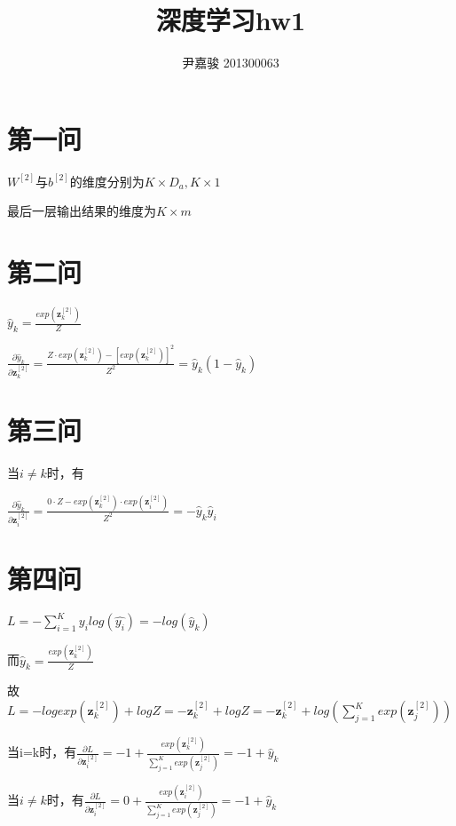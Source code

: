 \documentclass[a4paper,11pt,onecolumn,twoside]{article}
\title{\textbf{深度学习hw1}}
\author{
尹嘉骏 201300063\\[2pt]%

}
\date{}
\begin{document}
\maketitle
\section*{第一问}
$W^{[2]}$与$b^{[2]}$的维度分别为$K\times D_{a},K\times 1$

最后一层输出结果的维度为$K\times m$
\section*{第二问}
$\hat{y}_k=\frac{exp(\textbf{z}^{[2]}_k)}{Z}$

$\frac{\partial \hat{y}_k}{\partial \textbf{z}^{[2]}_k}=\frac{Z\cdot exp(\textbf{z}^{[2]}_k)-[exp(\textbf{z}^{[2]}_k)]^2}{Z^2}=\hat{y}_k(1-\hat{y}_k)$

\section*{第三问}
当$i\not=k$时，有

$\frac{\partial \hat{y}_k}{\partial \textbf{z}^{[2]}_i}=\frac{0\cdot Z-exp(\textbf{z}^{[2]}_k)\cdot exp(\textbf{z}^{[2]}_i)}{Z^2}=-\hat{y}_k\hat{y}_i$

\section*{第四问}
$L=-\sum_{i=1}^{K}y_ilog(\hat{y_i})=-log(\hat{y}_k)$

而$\hat{y}_k=\frac{exp(\textbf{z}^{[2]}_k)}{Z}$

故$L=-log exp(\textbf{z}^{[2]}_k)+logZ=-\textbf{z}^{[2]}_k+logZ=-\textbf{z}^{[2]}_k+log(\sum_{j=1}^{K}exp(\textbf{z}^{[2]}_j))$

当i=k时，有$\frac{\partial L}{\partial \textbf{z}^{[2]}_i}=-1+\frac{exp(\textbf{z}^{[2]}_k)}{\sum_{j=1}^{K}exp(\textbf{z}^{[2]}_j)}=-1+\hat{y}_k$

当$i\not=k$时，有$\frac{\partial L}{\partial \textbf{z}^{[2]}_i}=0+\frac{exp(\textbf{z}^{[2]}_i)}{\sum_{j=1}^{K}exp(\textbf{z}^{[2]}_j)}=-1+\hat{y}_k$
\end{document}
